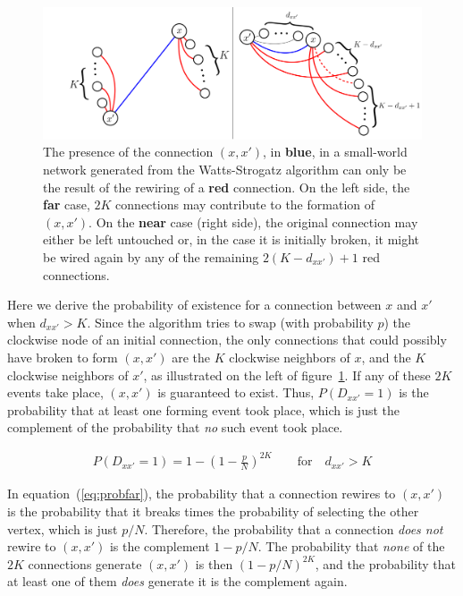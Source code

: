 \begin{figure}
    \centering
    \includegraphics[width=0.9\linewidth]{fig/rewire_contributions.png}
    \caption{The presence of the connection $(x,x')$, in {\color{blue}\textbf{blue}}, in a small-world network generated from the
        Watts-Strogatz algorithm can only be the result of the rewiring of a {\color{red}\textbf{red}} connection. On the left side,
        the \textbf{far} case, $2K$ connections may contribute to the formation of $(x,x')$. On the \textbf{near} case (right side),
        the original connection may either be left untouched or, in the case it is initially broken, it might be wired again by any of
        the remaining $2(K-d_{xx'})+1$ red connections.}
    \label{fig:rewire_contributions}
\end{figure}

Here we derive the probability of existence for a connection between $x$ and $x'$ when $d_{xx'}>K$. Since the algorithm tries to swap
(with probability $p$) the clockwise node of an initial connection, the only connections that could possibly have broken to form
$(x,x')$ are the $K$ clockwise neighbors of $x$, and the $K$ clockwise neighbors of $x'$, as illustrated on the left of
figure~\ref{fig:rewire_contributions}. If any of these $2K$ events take place, $(x,x')$ is guaranteed to exist. Thus, $P(D_{xx'}=1)$ is
the probability that at least one forming event took place, which is just the complement of the probability that \textit{no} such event
took place.

\begin{align}
    P(D_{xx'}=1) = 1 - \left( 1 - \frac{p}{N} \right)^{2K} \qquad \text{for} \quad d_{xx'} > K
    \label{eq:probfar}
\end{align}

In equation~(\ref{eq:probfar}), the probability that a connection rewires to $(x,x')$ is the probability that it breaks times the
probability of selecting the other vertex, which is just $p/N$. Therefore, the probability that a connection \textit{does not} rewire
to $(x,x')$ is the complement $1-p/N$. The probability that \textit{none} of the $2K$ connections generate $(x,x')$ is then
$(1-p/N)^{2K}$, and the probability that at least one of them \textit{does} generate it is the complement again.

